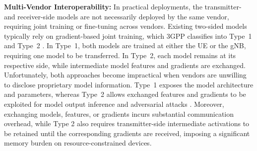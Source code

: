 \documentclass[10pt,twocolumn]{IEEEtran}
\begin{document}









\vspace{1mm}
{\bf Multi-Vendor Interoperability:} In practical deployments, the transmitter- and receiver-side models are not necessarily deployed by the same vendor, requiring joint training or fine-tuning across vendors. Existing two-sided models typically rely on gradient-based joint training, which 3GPP classifies into Type~1 and Type~2 \cite{3gpp_tr38843_rel19}\footnotemark. In Type~1, both models are trained at either the UE or the gNB, requiring one model to be transferred. In Type~2, each model remains at its respective side, while intermediate model features and gradients are exchanged. Unfortunately, both approaches become impractical when vendors are unwilling to disclose proprietary model information. Type~1 exposes the model architecture and parameters, whereas Type~2 allows exchanged features and gradients to be exploited for model output inference and adversarial attacks \cite{li2024emgan,papernot2016limitations}. Moreover, exchanging models, features, or gradients incurs substantial communication overhead, while Type 2 also requires transmitter-side intermediate activations to be retained until the corresponding gradients are received, imposing a significant memory burden on resource-constrained devices. 





\end{document}
